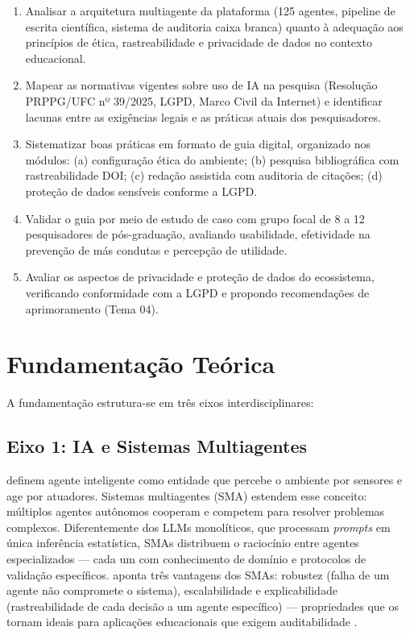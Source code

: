 \documentclass[
    12pt,
    openany,
    oneside,
    a4paper,
    brazilian
]{abntex2}
\begin{document}
\begin{enumerate}[label=\arabic*.]
    \item Analisar a arquitetura multiagente da plataforma (125 agentes, pipeline de escrita científica, sistema de auditoria caixa branca) quanto à adequação aos princípios de ética, rastreabilidade e privacidade de dados no contexto educacional.
    
    \item Mapear as normativas vigentes sobre uso de IA na pesquisa (Resolução PRPPG/UFC nº 39/2025, LGPD, Marco Civil da Internet) e identificar lacunas entre as exigências legais e as práticas atuais dos pesquisadores.
    
    \item Sistematizar boas práticas em formato de guia digital, organizado nos módulos: (a) configuração ética do ambiente; (b) pesquisa bibliográfica com rastreabilidade DOI; (c) redação assistida com auditoria de citações; (d) proteção de dados sensíveis conforme a LGPD.
    
    \item Validar o guia por meio de estudo de caso com grupo focal de 8 a 12 pesquisadores de pós-graduação, avaliando usabilidade, efetividade na prevenção de más condutas e percepção de utilidade.
    
    \item Avaliar os aspectos de privacidade e proteção de dados do ecossistema, verificando conformidade com a LGPD e propondo recomendações de aprimoramento (Tema 04).
\end{enumerate}

\section{Fundamentação Teórica}

A fundamentação estrutura-se em três eixos interdisciplinares:

\subsection{Eixo 1: IA e Sistemas Multiagentes}

\citeauthor{russell2022} definem agente inteligente como entidade que percebe o ambiente por sensores e age por atuadores. Sistemas multiagentes (SMA) estendem esse conceito: múltiplos agentes autônomos cooperam e competem para resolver problemas complexos. Diferentemente dos LLMs monolíticos, que processam \textit{prompts} em única inferência estatística, SMAs distribuem o raciocínio entre agentes especializados --- cada um com conhecimento de domínio e protocolos de validação específicos. \citeauthor{wooldridge2009} aponta três vantagens dos SMAs: robustez (falha de um agente não compromete o sistema), escalabilidade e explicabilidade (rastreabilidade de cada decisão a um agente específico) --- propriedades que os tornam ideais para aplicações educacionais que exigem auditabilidade \cite{wooldridge2009}.
\end{document}
